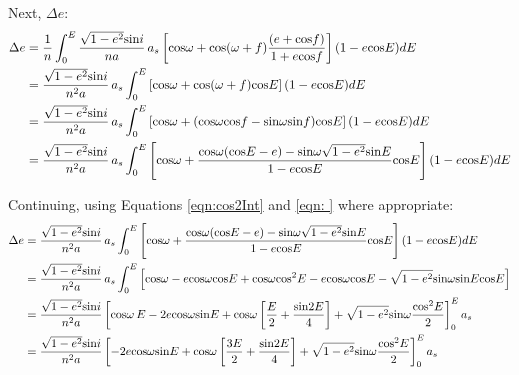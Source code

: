 \documentclass[]{aiaa-tc}%
\begin{document}
Next, $\Delta e$:
	\begin{equation}
\begin{aligned} 
\Delta e &=\frac{1}{n}\int_0^E\frac{\sqrt{1-e^2}\textup{sin}i}{na}\, a_s\left [ \textup{cos}\omega +\textup{cos}(\omega +f )\frac{(e+\textup{cos}f)}{1+e\textup{cos}f}\right ](1-e\textup{cos}E)dE \\
 &=\frac{\sqrt{1-e^2}\textup{sin}i}{n^2a}\, a_s\int_0^E\left [ \textup{cos}\omega +\textup{cos}(\omega +f )\textup{cos}E\right ](1-e\textup{cos}E)dE \\
 &=\frac{\sqrt{1-e^2}\textup{sin}i}{n^2a}\, a_s\int_0^E\left [ \textup{cos}\omega +(\textup{cos}\omega \textup{cos}f-\textup{sin}\omega \textup{sin}f )\textup{cos}E\right ](1-e\textup{cos}E)dE \\
 &=\frac{\sqrt{1-e^2}\textup{sin}i}{n^2a}\, a_s\int_0^E\left [ \textup{cos}\omega +\frac{\textup{cos}\omega(\textup{cos}E-e)- \textup{sin}\omega\sqrt{1-e^2}\textup{sin}E }{1-e\textup{cos}E}\textup{cos}E\right ](1-e\textup{cos}E)dE \\
\end{aligned}
	\end{equation}

Continuing, using Equations \ref{eqn:cos2Int} and \ref{eqn:
} where appropriate:
	\begin{equation}
\begin{aligned} 
\Delta e &=\frac{\sqrt{1-e^2}\textup{sin}i}{n^2a}\, a_s\int_0^E\left [ \textup{cos}\omega +\frac{\textup{cos}\omega(\textup{cos}E-e)- \textup{sin}\omega\sqrt{1-e^2}\textup{sin}E }{1-e\textup{cos}E}\textup{cos}E\right ](1-e\textup{cos}E)dE \\
 &=\frac{\sqrt{1-e^2}\textup{sin}i}{n^2a}\, a_s\int_0^E\left [ \textup{cos}\omega -e\textup{cos}\omega \textup{cos}E +\textup{cos}\omega\textup{cos}^2E-e\textup{cos}\omega\textup{cos}E- \sqrt{1-e^2}\textup{sin}\omega\textup{sin}E \textup{cos}E\right ] \\
 &=\frac{\sqrt{1-e^2}\textup{sin}i}{n^2a} \left [ \textup{cos}\omega\,E -2e\textup{cos}\omega \textup{sin}E +\textup{cos}\omega\left [\frac{E}{2}+\frac{\textup{sin} 2E}{4}  \right ] + \sqrt{1-e^2}\textup{sin}\omega\frac{\textup{cos}^2E}{2}\right ]_0^Ea_s \\
 &=\frac{\sqrt{1-e^2}\textup{sin}i}{n^2a} \left [ -2e\textup{cos}\omega \textup{sin}E +\textup{cos}\omega\left [\frac{3E}{2}+\frac{\textup{sin} 2E}{4}  \right ] + \sqrt{1-e^2}\textup{sin}\omega\frac{\textup{cos}^2E}{2}\right ]_0^Ea_s \\
\end{aligned}
	\end{equation}
\end{document}
